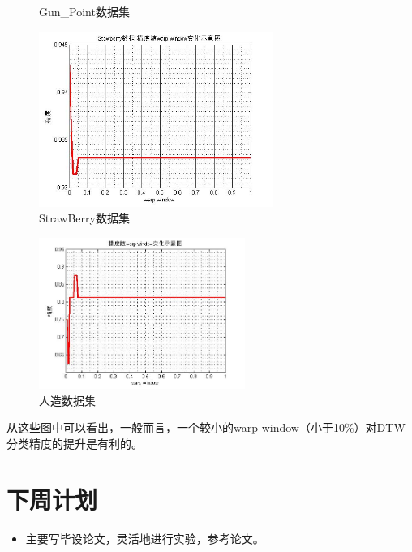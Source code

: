 \documentclass{ctexart}
\begin{document}
\begin{itemize}
\begin{enumerate}
\begin{figure}
\begin{minipage}{0.5\linewidth}
                \caption{Gun\_Point数据集}
                \label{fig:side:c}
                \end{minipage}
                \hfill
                \begin{minipage}{0.5\linewidth}
                \centering
                \includegraphics[width=3in]{5.jpg}
                \caption{StrawBerry数据集}
                \label{fig:side:d}
                \end{minipage}
            \end{figure}
            
            \begin{figure}
              \centering
              \includegraphics[width=0.6\textwidth]{2.jpg}
              \caption{人造数据集}\label{fig:2}
            \end{figure}
            
            从这些图中可以看出，一般而言，一个较小的warp window（小于10\%）对DTW分类精度的提升是有利的。
      
      \end{enumerate}
      

\end{itemize}

\section*{下周计划}
\begin{itemize}
  \item 主要写毕设论文，灵活地进行实验，参考论文。
\end{itemize}
\end{document}
